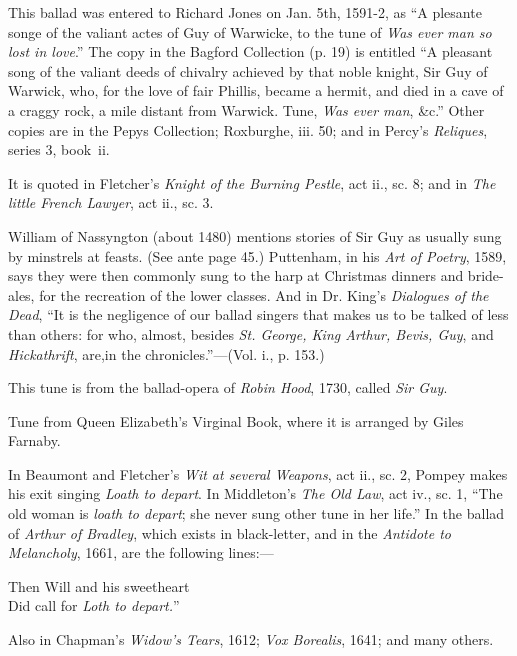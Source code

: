 


This ballad was entered to Richard Jones on Jan. 5th, 1591-2, as “A plesante
songe of the valiant actes of Guy of Warwicke, to the tune of \textit{Was ever man so
lost in love}.” The copy in the Bagford Collection (p. 19) is entitled “A pleasant
song of the valiant deeds of chivalry achieved by that noble knight, Sir Guy of
Warwick, who, for the love of fair Phillis, \pagebreak became a hermit, and died in a cave of
a craggy rock, a mile distant from Warwick. Tune, \textit{Was ever man}, \&c.” Other
copies are in the Pepys Collection; Roxburghe, iii. 50; and in Percy’s \textit{Reliques},
series 3, book~ii.

It is quoted in Fletcher’s \textit{Knight of the Burning Pestle}, act ii., sc. 8; and in
\textit{The little French Lawyer}, act ii., sc. 3.

William of Nassyngton (about 1480) mentions stories of Sir Guy as usually
sung by minstrels at feasts. (See ante page 45.) Puttenham, in his \textit{Art of
Poetry}, 1589, says they were then commonly sung to the harp at Christmas
dinners and bride-ales, for the recreation of the lower classes. And in Dr. King’s
\textit{Dialogues of the Dead}, “It is the negligence of our ballad singers that makes us to
be talked of less than others: for who, almost, besides \textit{St. George, King Arthur,
Bevis, Guy}, and \textit{Hickathrift}, are,in the chronicles.”—(Vol. i., p. 153.)

This tune is from the ballad-opera of \textit{Robin Hood}, 1730, called \textit{Sir Guy}.



\pagebreak


Tune from Queen Elizabeth’s Virginal Book, where it is arranged by Giles
Farnaby.

In Beaumont and Fletcher’s \textit{Wit at several Weapons}, act ii., sc. 2, Pompey
makes his exit singing \textit{Loath to depart}. In Middleton’s \textit{The Old Law}, act iv.,
sc. 1, “The old woman is \textit{loath to depart}; she never sung other tune in her life.”
In the ballad of \textit{Arthur of Bradley}, which exists in black-letter, and in the \textit{Antidote
to Melancholy}, 1661, are the following lines:—
\settowidth{\versewidth}{Then Will and his sweetheart}
\begin{scverse}
Then Will and his sweetheart\\
Did call for \textit{Loth to depart.}”
\end{scverse}
Also in Chapman’s \textit{Widow’s Tears}, 1612; \textit{Vox Borealis}, 1641; and many others.


